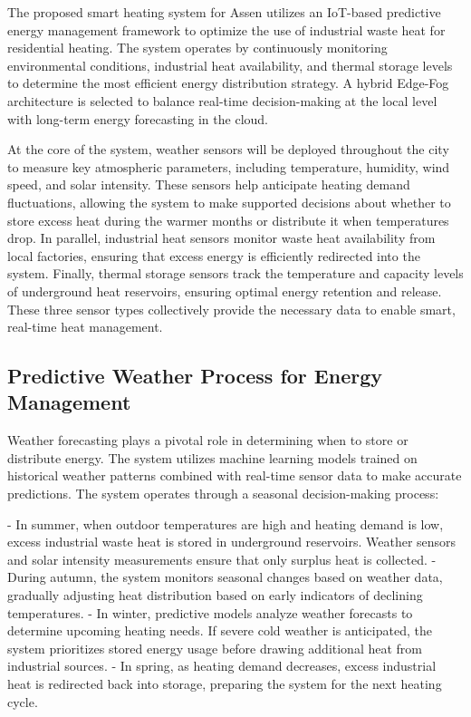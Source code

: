 \documentclass{article}
\begin{document}
The proposed smart heating system for Assen utilizes an IoT-based predictive energy management framework to optimize the use of industrial waste heat for residential heating. The system operates by continuously monitoring environmental conditions, industrial heat availability, and thermal storage levels to determine the most efficient energy distribution strategy. A hybrid Edge-Fog architecture is selected to balance real-time decision-making at the local level with long-term energy forecasting in the cloud.

At the core of the system, weather sensors will be deployed throughout the city to measure key atmospheric parameters, including temperature, humidity, wind speed, and solar intensity. These sensors help anticipate heating demand fluctuations, allowing the system to make supported decisions about whether to store excess heat during the warmer months or distribute it when temperatures drop. In parallel, industrial heat sensors monitor waste heat availability from local factories, ensuring that excess energy is efficiently redirected into the system. Finally, thermal storage sensors track the temperature and capacity levels of underground heat reservoirs, ensuring optimal energy retention and release. These three sensor types collectively provide the necessary data to enable smart, real-time heat management.

\subsection{Predictive Weather Process for Energy Management}

Weather forecasting plays a pivotal role in determining when to store or distribute energy. The system utilizes machine learning models trained on historical weather patterns combined with real-time sensor data to make accurate predictions. The system operates through a seasonal decision-making process:

- In summer, when outdoor temperatures are high and heating demand is low, excess industrial waste heat is stored in underground reservoirs. Weather sensors and solar intensity measurements ensure that only surplus heat is collected.
- During autumn, the system monitors seasonal changes based on weather data, gradually adjusting heat distribution based on early indicators of declining temperatures.
- In winter, predictive models analyze weather forecasts to determine upcoming heating needs. If severe cold weather is anticipated, the system prioritizes stored energy usage before drawing additional heat from industrial sources.
- In spring, as heating demand decreases, excess industrial heat is redirected back into storage, preparing the system for the next heating cycle.
\end{document}

